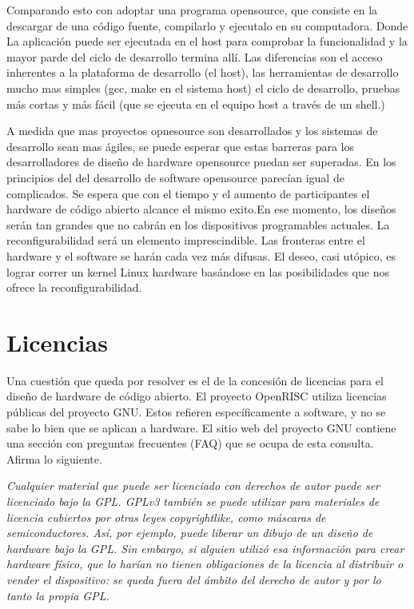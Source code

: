 Comparando esto con adoptar una programa opensource, que consiste en la descargar de una código fuente, compilarlo y ejecutalo en su computadora. Donde La aplicación puede ser ejecutada en el  host para comprobar la funcionalidad y la mayor parde del ciclo de desarrollo termina allí. Las diferencias son el acceso inherentes a la plataforma de desarrollo (el host), las herramientas de desarrollo mucho mas simples (gcc, make en el sistema host) el ciclo de desarrollo, pruebas más cortas y más fácil (que se ejecuta en el equipo host a través de un shell.)

A medida que mas proyectos opnesource son desarrollados y los sistemas de desarrollo sean mas ágiles, se puede esperar que estas barreras para los desarrolladores de diseño de hardware opensource puedan ser superadas. En los principios del del desarrollo de software opensource parecían igual de complicados. Se espera que con el tiempo y el aumento de participantes el hardware de código abierto alcance el mismo exito.En ese momento, los diseños serán tan grandes que no cabrán en los dispositivos programables actuales. La reconfigurabilidad será un elemento imprescindible. Las fronteras entre el hardware y el software se harán cada vez más difusas. El deseo, casi utópico, es lograr correr un kernel Linux hardware basándose en las posibilidades que nos ofrece la reconfigurabilidad. 
	

\section{Licencias}

Una cuestión que queda por resolver es el de la concesión de licencias para el diseño de hardware de código abierto. El proyecto OpenRISC utiliza licencias públicas del proyecto GNU. Estos refieren específicamente a software, y no se sabe lo bien que se aplican a hardware.
El sitio web del proyecto GNU contiene una sección con preguntas frecuentes (FAQ) que se ocupa de esta consulta. Afirma lo siguiente.

\textit{Cualquier material que puede ser licenciado con derechos de autor puede ser licenciado bajo la GPL.
GPLv3 también se puede utilizar para materiales de licencia cubiertos por otras leyes copyrightlike, como máscaras de semiconductores. Así, por ejemplo, puede liberar un dibujo de un diseño de hardware bajo la GPL. Sin embargo, si
alguien utilizó esa información para crear hardware físico, que lo harían
no tienen obligaciones de la licencia al distribuir o vender el dispositivo: se
queda fuera del ámbito del derecho de autor y por lo tanto la propia GPL.}

